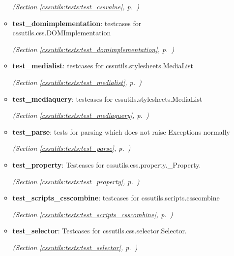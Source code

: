 \begin{itemize}
\begin{itemize}
  \textit{(Section \ref{cssutils:tests:test_cssvalue}, p.~\pageref{cssutils:tests:test_cssvalue})}

    \item \textbf{test\_domimplementation}: testcases for cssutils.css.DOMImplementation



  \textit{(Section \ref{cssutils:tests:test_domimplementation}, p.~\pageref{cssutils:tests:test_domimplementation})}

    \item \textbf{test\_medialist}: testcases for cssutils.stylesheets.MediaList



  \textit{(Section \ref{cssutils:tests:test_medialist}, p.~\pageref{cssutils:tests:test_medialist})}

    \item \textbf{test\_mediaquery}: testcases for cssutils.stylesheets.MediaList



  \textit{(Section \ref{cssutils:tests:test_mediaquery}, p.~\pageref{cssutils:tests:test_mediaquery})}

    \item \textbf{test\_parse}: tests for parsing which does not raise Exceptions normally



  \textit{(Section \ref{cssutils:tests:test_parse}, p.~\pageref{cssutils:tests:test_parse})}

    \item \textbf{test\_property}: Testcases for cssutils.css.property.\_Property.



  \textit{(Section \ref{cssutils:tests:test_property}, p.~\pageref{cssutils:tests:test_property})}

    \item \textbf{test\_scripts\_csscombine}: testcases for cssutils.scripts.csscombine



  \textit{(Section \ref{cssutils:tests:test_scripts_csscombine}, p.~\pageref{cssutils:tests:test_scripts_csscombine})}

    \item \textbf{test\_selector}: Testcases for cssutils.css.selector.Selector.



  \textit{(Section \ref{cssutils:tests:test_selector}, p.~\pageref{cssutils:tests:test_selector})}


\end{itemize}
\end{itemize}
